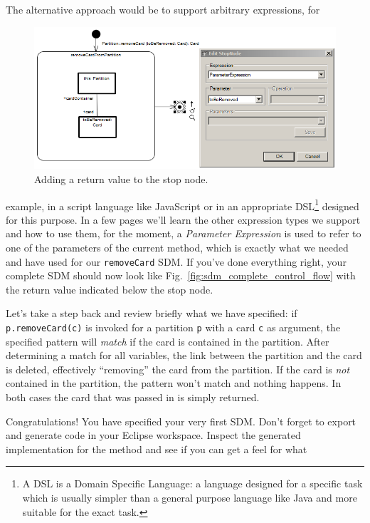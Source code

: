 The alternative approach would be to
support arbitrary expressions, for\clearpage
\begin{figure}[htp]
\begin{center}
  \includegraphics[width=\textwidth]{pics/sdmBilder/removeCard/sdm14RAW}
  \caption{Adding a return value to the stop node.}  
  \label{fig:stop_node_return_value}
\end{center}
\end{figure}
example, in a script language like
JavaScript or in an appropriate DSL\footnote{A DSL is a Domain Specific
Language: a language designed for a specific task which is usually simpler
than a general purpose language like Java and more suitable for the exact task.}
designed for this purpose. In a few pages we'll learn the other expression types
we support and how to use them, for the moment, a \emph{Parameter Expression} is
used to refer to one of the parameters of the current method, which is exactly
what we needed and have used for our \texttt{removeCard} SDM.
If you've done everything right, your complete SDM should now look like
Fig.~\ref{fig:sdm_complete_control_flow} with the return value indicated below
the stop node.

Let's take a step back and review briefly what we have specified:  if
\texttt{p.remove\-Card(c)} is invoked for a partition \texttt{p} with a card
\texttt{c} as argument, the specified pattern will \emph{match} if the card is
contained in the partition.  After determining a match for all variables, the
link between the partition and the card is deleted, effectively ``removing'' the
card from the partition.  If the card is \emph{not} contained in the partition,
the pattern won't match and nothing happens. In both cases the card that was
passed in is simply returned.

Congratulations!  You have specified your very first SDM.  Don't forget to
export and generate code in your Eclipse workspace.  Inspect the generated
implementation for the method and see if you can get a feel for what\clearpage
 
